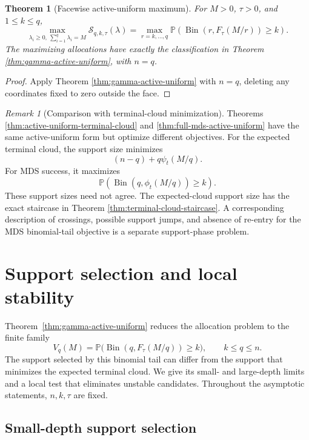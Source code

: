 \documentclass[11pt]{article}
\newtheorem{theorem}{Theorem}
\theoremstyle{definition}
\theoremstyle{remark}
\newtheorem{remark}{Remark}
\DeclareMathOperator{\Bin}{Bin}
\newcommand{\Pbb}{\mathbb P}
\newcommand{\1}{\mathbf 1}
\begin{document}
\begin{theorem}[Facewise active-uniform maximum]
\label{thm:facewise-active-uniform-maximum}
For \(M>0\), \(\tau>0\), and \(1\le k\le q\),
\[
  \max_{\lambda_i\ge0,\ \sum_{i=1}^q\lambda_i=M}
       \mathcal S_{q,k,\tau}(\lambda)
  =\max_{r=k,\ldots,q}
       \Pbb\left(\Bin(r,F_\tau(M/r))\ge k\right).
\]
The maximizing allocations have exactly the classification in Theorem \ref{thm:gamma-active-uniform}, with \(n=q\).
\end{theorem}

\begin{proof}
Apply Theorem \ref{thm:gamma-active-uniform} with \(n=q\), deleting any coordinates fixed to zero outside the face.
\end{proof}

\begin{remark}[Comparison with terminal-cloud minimization]
Theorems \ref{thm:active-uniform-terminal-cloud} and \ref{thm:full-mds-active-uniform} have the same active-uniform form but optimize different objectives.  For the expected terminal cloud, the support size minimizes
\[
  (n-q)+q\psi_t(M/q).
\]
For MDS success, it maximizes
\[
  \Pbb\left(\Bin(q,\phi_t(M/q))\ge k\right).
\]
These support sizes need not agree.  The expected-cloud support size has the exact staircase in Theorem \ref{thm:terminal-cloud-staircase}.  A corresponding description of crossings, possible support jumps, and absence of re-entry for the MDS binomial-tail objective is a separate support-phase problem.
\end{remark}

\section{Support selection and local stability}
\label{sec:mds-support}

Theorem~\ref{thm:gamma-active-uniform} reduces the allocation problem to
the finite family
\begin{equation}\label{eq:mds-support-values}
  V_q(M)=\Pbb\bigl(\Bin(q,F_\tau(M/q))\ge k\bigr),
  \qquad k\le q\le n.
\end{equation}
The support selected by this binomial tail can differ from the support
that minimizes the expected terminal cloud.  We give its small- and
large-depth limits and a local test that eliminates unstable candidates.
Throughout the asymptotic statements, \(n,k,\tau\) are fixed.

\subsection{Small-depth support selection}
\end{document}
